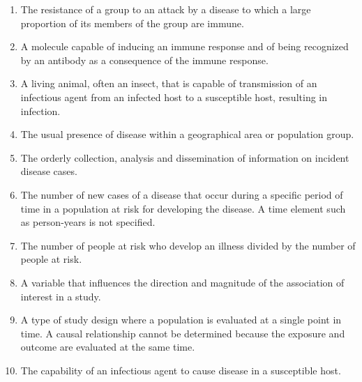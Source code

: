 \begin{enumerate}

\item The resistance of a group to an attack by a disease to which a large proportion of its members of the group are immune.



\item  A molecule capable of inducing an immune response and of being recognized by an antibody as a consequence of the immune response.


\item   A living animal, often an insect, that is capable of transmission of an infectious agent from an infected host to a susceptible host, resulting in infection.  %


\item     The usual presence of disease within a geographical area or population group.


\item   The orderly collection, analysis and dissemination of information on incident disease cases.


\item    The number of new cases of a disease that occur during a specific period of time in a population at risk for developing the disease.  A time element such as person-years is not specified.


\item    The number of people at risk who develop an illness divided by the number of people at risk.


\item    A variable that influences the direction and magnitude of the association of interest in a study.


\item    A type of study design where a population is evaluated at a single point in time.  A causal relationship cannot be determined because the exposure and outcome are evaluated at the same time.


\item      The capability of an infectious agent to cause disease in a susceptible host.  
\end{enumerate}

